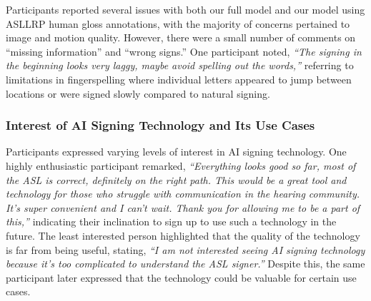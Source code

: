

% 

Participants reported several issues with both our full model and our model using ASLLRP human gloss annotations, with the majority of concerns pertained to image and motion quality. However, there were a small number of comments on ``missing information'' and ``wrong signs.'' One participant noted, \textit{``The signing in the beginning looks very laggy, maybe avoid spelling out the words,''} referring to limitations in fingerspelling where individual letters appeared to jump between locations or were signed  slowly compared to natural signing. 

\subsubsection{Interest of AI Signing Technology and Its Use Cases} 
Participants expressed varying levels of interest in AI signing technology. One highly enthusiastic participant remarked, 
\textit{``Everything looks good so far, most of the ASL is correct, definitely on the right path. This would be a great tool and technology for those who struggle with communication in the hearing community. It's super convenient and I can't wait. Thank you for allowing me to be a part of this,''} indicating their inclination to sign up to use such a technology in the future. The least interested person highlighted that the quality of the technology is far from being useful, stating, \textit{``I am not interested seeing AI signing technology because it's too complicated to understand the ASL signer.''} Despite this, the same participant later expressed that the technology could be valuable for certain use cases. 


